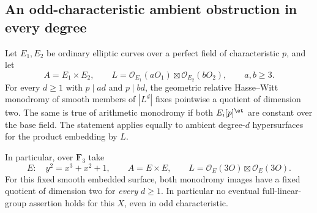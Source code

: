 \subsection{An odd-characteristic ambient obstruction in every degree}
\label{subsec:product-surface-obstruction}

\begin{proposition}\label{prop:product-surface-norm-obstruction}
Let $E_1,E_2$ be ordinary elliptic curves over a perfect
field of characteristic $p$, and let
\[
 A=E_1\times E_2,\qquad
 L=\mathcal O_{E_1}(aO_1)\boxtimes\mathcal O_{E_2}(bO_2),
       \qquad a,b\geq3.
\]
For every $d\geq1$ with $p\mid ad$ and $p\mid bd$, the
geometric relative Hasse--Witt monodromy of smooth members
of $|L^d|$ fixes pointwise a quotient of dimension two.
The same is true of arithmetic monodromy if both
$E_i[p]^{\et}$ are constant over the base field.
The statement applies equally to ambient degree-$d$
hypersurfaces for the product embedding by $L$.

In particular, over $\mathbf F_3$ take
\begin{equation}\label{eq:odd-product-explicit-elliptic}
 E:\quad y^2=x^3+x^2+1,
 \qquad A=E\times E,\qquad
 L=\mathcal O_E(3O)\boxtimes\mathcal O_E(3O).
\end{equation}
For this fixed smooth embedded surface, both monodromy
images have a fixed quotient of dimension two for
\emph{every} $d\geq1$.  In particular no eventual
full-linear-group assertion holds for this $X$, even
in odd characteristic.
\end{proposition}

